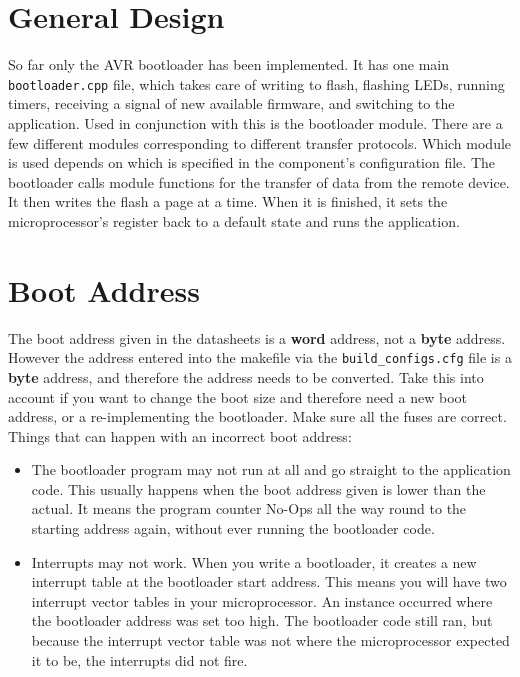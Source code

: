 \documentclass[a4paper, oneside, 11pt, titlepage, onecolumn, openright]{report}
\begin{document}
{{\section{General Design}
			\label{s:BootloaderGeneralDesign}
			So far only the AVR bootloader has been implemented. It has one main \texttt{bootloader.cpp} file, which takes care of writing to flash, flashing LEDs, running timers, receiving a signal of new available firmware, and switching to the application. Used in conjunction with this is the bootloader module. There are a few different modules corresponding to different transfer protocols. Which module is used depends on which is specified in the component's configuration file. 
			The bootloader calls module functions for the transfer of data from the remote device. It then writes the flash a page at a time. When it is finished, it sets the microprocessor's register back to a default state and runs the application.
			
\section{Boot Address}
			\label{s:BootloaderBootAddress}
The boot address given in the datasheets is a \textbf{word} address, not a \textbf{byte} address. However the address entered into the makefile via the \texttt{build\_configs.cfg} file is a \textbf{byte} address, and therefore the address needs to be converted. Take this into account if you want to change the boot size and therefore need a new boot address, or a re-implementing the bootloader. Make sure all the fuses are correct. Things that can happen with an incorrect boot address:

\begin{itemize}
\item The bootloader program may not run at all and go straight to the application code. This usually happens when the boot address given is lower than the actual. It means the program counter No-Ops all the way round to the starting address again, without ever running the bootloader code.
\item Interrupts may not work. When you write a bootloader, it creates a new interrupt table at the bootloader start address. This means you will have two interrupt vector tables in your microprocessor. An instance occurred where the bootloader address was set too high. The bootloader code still ran, but because the interrupt vector table was not where the microprocessor expected it to be, the interrupts did not fire.
\end{itemize}

}}
\end{document}

